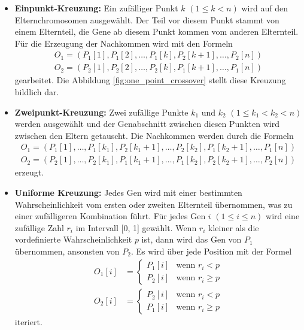 \begin{itemize}
	\item \textbf{Einpunkt-Kreuzung:} Ein zufälliger Punkt \( k \) \((1 \leq k < n)\)
%
	wird auf den Elternchromosomen ausgewählt. Der Teil vor diesem Punkt stammt
	von einem Elternteil, die Gene ab diesem Punkt kommen vom anderen Elternteil. 
	Für die Erzeugung der Nachkommen wird mit den Formeln
	\begin{align*}
		O_1 = (P_1[1], P_1[2], \ldots, P_1[k], P_2[k+1], \ldots, P_2[n])\\
		O_2 = (P_2[1], P_2[2], \ldots, P_2[k], P_1[k+1], \ldots, P_1[n])
	\end{align*}
	gearbeitet. Die Abbildung \ref{fig:one_point_crossover} stellt diese Kreuzung bildlich dar.
	\item \textbf{Zweipunkt-Kreuzung:} Zwei zufällige Punkte \( k_1 \) und \( k_2 \)
%
	\((1 \leq k_1 < k_2 < n)\) werden ausgewählt und
	der Genabschnitt zwischen diesen Punkten wird zwischen den Eltern 
	getauscht. Die Nachkommen werden durch die Formeln
	\begin{align*}
		O_1 = (P_1[1], \ldots, P_1[k_1], P_2[k_1+1], \ldots, P_2[k_2], P_1[k_2+1], \ldots, P_1[n])\\
		O_2 = (P_2[1], \ldots, P_2[k_1], P_1[k_1+1], \ldots, P_1[k_2], P_2[k_2+1], \ldots, P_2[n])
	\end{align*}
	erzeugt.
	\item \textbf{Uniforme Kreuzung:} Jedes Gen wird mit einer bestimmten
%
%
	Wahrscheinlichkeit vom ersten oder zweiten Elternteil übernommen, was zu
	einer zufälligeren Kombination führt. Für jedes Gen \( i \) \((1 \leq i \leq n)\)
	wird eine zufällige Zahl \( r_i \) im Intervall [0, 1] gewählt. Wenn
	\( r_i \) kleiner als die vordefinierte Wahrscheinlichkeit \( p \) ist,
	dann wird das Gen von \( P_1 \) übernommen, ansonsten von \( P_2 \). Es
	wird über jede Position mit der Formel 
	\begin{align*}
		O_1[i] &=
		\begin{cases} 
			P_1[i] & \text{wenn } r_i < p       \\
			P_2[i] & \text{wenn } r_i \geq p 
		\end{cases}
		\\
		O_2[i] &=
		\begin{cases} 
			P_2[i] & \text{wenn } r_i < p       \\
			P_1[i] & \text{wenn } r_i \geq p 
		\end{cases}
	\end{align*}
	iteriert.
\end{itemize}

